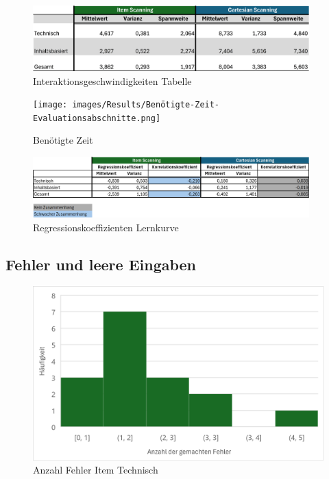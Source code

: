\begin{figure}[tbh]
 \centering
\includegraphics[width=0.95\textwidth]{images/Results/Interaktionsgeschwindigkeiten-Table.png}
 \caption{Interaktionsgeschwindigkeiten Tabelle}
 \label{fig:InteraktionsgeschwindigkeitenTable}
\end{figure}

\begin{figure}[tbh]
 \centering
\texttt{[image: images/Results/Benötigte-Zeit-Evaluationsabschnitte.png]}
 \caption{Benötigte Zeit}
 \label{fig:zeit}
\end{figure}

\begin{figure}[tbh]
 \centering
\includegraphics[width=0.95\textwidth]{images/Results/Regressionskoeffizienten-Korrelation-Table-Lernkurve-Geschwindigkeit.png}
 \caption{Regressionskoeffizienten Lernkurve}
 \label{fig:RegressionskoeffizientenTable}
\end{figure}

\subsection{Fehler und leere Eingaben}

\begin{figure}[tbh]
 \centering
\includegraphics{images/Results/Histogramm-Anzahl-Fehler-technisch-item.png}
 \caption{Anzahl Fehler Item Technisch}
 \label{fig:anzahlFehlerItemTechnisch}
\end{figure}

